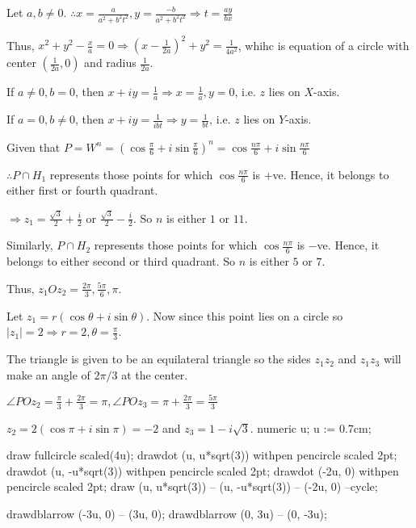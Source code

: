   Let $a, b\neq 0$. $\therefore x = \frac{a}{a^2 + b^2t^2}, y = \frac{-b}{a^2 + b^2t^2}\Rightarrow t
  = \frac{ay}{bx}$

  Thus, $x^2 + y^2 - \frac{x}{a} = 0 \Rightarrow \left(x - \frac{1}{2a}\right)^2 + y^2 = \frac{1}{4a^2}$,
  whihc is equation of a circle with center $\left(\frac{1}{2a}, 0\right)$ and radius $\frac{1}{2a}$.

  If $a\neq 0, b = 0$, then $x + iy = \frac{1}{a}\Rightarrow x = \frac{1}{a}, y = 0$, i.e. $z$ lies on
  $X$-axis.

  If $a = 0, b\neq 0$, then $x + iy = \frac{1}{ibt}\Rightarrow y = \frac{1}{bt}$, i.e. $z$ lies on $Y$-axis.
\item Given that $P = W^n = \left(\cos\frac{\pi}{6} + i\sin\frac{\pi}{6}\right)^n = \cos\frac{n\pi}{6} +
  i\sin\frac{n\pi}{6}$

  $\therefore P\cap H_1$ represents those points for which $\cos\frac{n\pi}{6}$ is $+$ve. Hence, it belongs
  to either first or fourth quadrant.

  $\Rightarrow z_1 = \frac{\sqrt{3}}{2} + \frac{i}{2}$ or $\frac{\sqrt{3}}{2} - \frac{i}{2}$. So $n$ is
  either $1$ or $11$.

  Similarly, $P\cap H_2$ represents those points for which $\cos\frac{n\pi}{6}$ is $-$ve. Hence, it belongs
  to either second or third quadrant. So $n$ is either $5$ or $7$.

  Thus, $z_1Oz_2 = \frac{2\pi}{3}, \frac{5\pi}{6}, \pi$.
\item Let $z_1 = r(\cos\theta + i\sin\theta)$. Now since this point lies on a circle so $|z_1| =
  2\Rightarrow r = 2, \theta = \frac{\pi}{3}$.

  The triangle is given to be an equilateral triangle  so the sides $z_1z_2$ and $z_1z_3$ will make an angle
  of $2\pi/3$ at the center.

  $\angle POz_2 = \frac{\pi}{3} + \frac{2\pi}{3} = \pi, \angle POz_3 = \pi + \frac{2\pi}{3}
  = \frac{5\pi}{3}$

  $z_2 = 2(\cos\pi + i\sin\pi) = -2$ and $z_3 = 1 - i\sqrt{3}$.
  \startplacefigure[location=force]
    \startMPcode
      numeric u;
      u := 0.7cm;

      draw fullcircle scaled(4u);
      drawdot (u, u*sqrt(3)) withpen pencircle scaled 2pt;
      drawdot (u, -u*sqrt(3)) withpen pencircle scaled 2pt;
      drawdot (-2u, 0) withpen pencircle scaled 2pt;
      draw (u, u*sqrt(3)) -- (u, -u*sqrt(3)) -- (-2u, 0) --cycle;

      drawdblarrow (-3u, 0) -- (3u, 0);
      drawdblarrow (0, 3u) -- (0, -3u);

